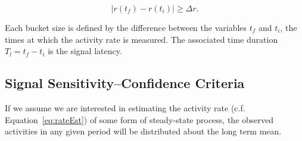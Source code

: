 \documentclass{article}
\begin{document}



\begin{equation}
    \label{eq:signal}
    | r(t_f) - r(t_i) | \geq \Delta r.
\end{equation}

Each bucket size is defined by the difference between the variables $t_f$ and $t_i$, the times at which 
the activity rate is measured. The associated time duration $T_l = t_f - t_i$ is the signal latency.  


\subsection{Signal Sensitivity--Confidence Criteria} 
\label{conf}


If  
\reversemarginpar\marginpar{\raggedleft
%
    \begin{tikzpicture}[scale=0.26]]
\draw [red, very thick, rotate around={-60: (3.0, 0)}] (-0.7, -0.7) rectangle(3.7, 0.7);
%
\draw [very thick, <->] (0.25000000000000006, 0.4330127018922193) -- (1.25, 2.165063509461097) ;
\draw [very thick, <->] (1.75, 2.165063509461097) -- (2.75, 0.4330127018922193) ;
\draw [very thick, <->] (2.5, 0) -- (0.5, 0) ;
%
\draw [orange, ultra thick] (0,0) circle [radius= 0.5 ];
\draw [yellow, ultra thick] ( 1.5 , 2.59807621135 ) circle [radius= 0.5 ];
\draw [green,  ultra thick] ( 3.0 , 0 ) circle [radius= 0.5 ];
    \end{tikzpicture}
%
%
} we assume we are interested in estimating the activity rate (c.f. Equation~\ref{eq:rateEst}) of some form of 
steady-state process, the observed activities in any given period will be distributed about the 
long term mean. 
\end{document}
